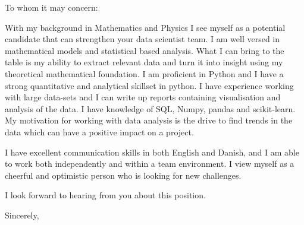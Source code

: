 \documentclass[10pt,a4paper]{letter}
\begin{document}
\begin{letter}{}
\opening{To whom it may concern:}

With my background in Mathematics and Physics I see myself as a potential candidate that can strengthen your data scientist team. I am well versed in mathematical models and statistical based analysis. What I can bring to the table is my ability to extract relevant data and turn it into insight using my theoretical mathematical foundation. I am proficient in Python and I have a strong quantitative and analytical skillset in python. I have experience working with large data-sets and I can write up reports containing visualisation and analysis of the data.  I have knowledge of SQL, Numpy, pandas and scikit-learn. My motivation for working with data analysis is the drive to find trends in the data which can have a positive impact on a project. 
 
I have excellent communication skills in both English and Danish, and I am able to work both independently and within a team environment. I view myself as a cheerful and optimistic person who is looking for new challenges.

I look forward to hearing from you about this position.   

\closing{Sincerely,}

\end{letter}

\end{document}
